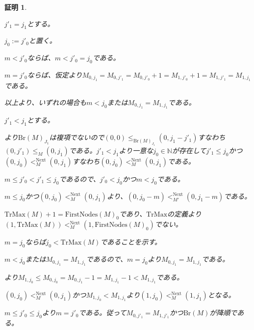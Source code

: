 \documentclass[dvipdfmx,uplatex]{jsarticle}
\theoremstyle{customnonumberbreakfortheorem}
\theoremstyle{customnonumberbreakforproof}
\newtheorem{hideableproof}{証明}
\begin{document}
\begin{hideableproof}
	\begin{indented}
		\item \(j'_1 = j_1\)とする。
		\begin{indented}
			\item \(j_0 := j'_0\)と置く。
			\item \(m < j'_0\)ならば、\(m < j'_0 = j_0\)である。
			\item \(m = j'_0\)ならば、仮定より\(M_{0,j_1} = M_{0,j'_1} = M_{0,j'_0}+1 = M_{1,j'_0}+1 = M_{1,j'_1} = M_{1,j_1}\)である。
			\item 以上より、いずれの場合も\(m < j_0\)または\(M_{0,j_1} = M_{1,j_1}\)である。
		\end{indented}
		\item \(j'_1 < j_1\)とする。
		\begin{indented}
			\item {}より\(\textrm{Br}(M)_{J_1}\)は複項でないので\((0,0) \leq_{\textrm{Br}(M)_{J_1}} (0,j_1-j'_1)\)すなわち\((0,j'_1) \leq_M (0,j_1)\)である。\(j'_1 < j_1\)より一意な\(j_0 \in \mathbb{N}\)が存在して\(j'_1 \leq j_0\)かつ\((0,j_0) <_M^{\textrm{Next}} (0,j_1)\)すなわち\((0,j_0) <_M^{\textrm{Next}} (0,j_1)\)である。
			\item \(m \leq j'_0 < j'_1 \leq j_0\)であるので、\(j'_0 < j_0\)かつ\(m < j_0\)である。
		\end{indented}
		\item \(m \leq j_0\)かつ\((0,j_0) <_M^{\textrm{Next}} (0,j_1)\)より、\((0,j_0-m) <_{M'}^{\textrm{Next}} (0,j_1-m)\)である。
		\item \(\textrm{TrMax}(M)+1 = \textrm{FirstNodes}(M)_0\)であり、\(\textrm{TrMax}\)の定義より\((1,\textrm{TrMax}(M)) <_M^{\textrm{Next}} (1,\textrm{FirstNodes}(M)_0)\)でない。
		\item
		\item \(m = j_0\)ならば\(j_0 < \textrm{TrMax}(M)\)であることを示す。
		\begin{indented}
			\item \(m < j_0\)または\(M_{0,j_1} = M_{1,j_1}\)であるので、\(m = j_0\)より\(M_{0,j_1} = M_{1,j_1}\)である。
			\item {}より\(M_{1,j_0} \leq M_{0,j_0} = M_{0,j_1}-1 = M_{1,j_1}-1 < M_{1,j_1}\)である。
			\item \((0,j_0) <_M^{\textrm{Next}} (0,j_1)\)かつ\(M_{1,j_0} < M_{1,j_1}\)より\((1,j_0) <_M^{\textrm{Next}} (1,j_1)\)となる。
			\item \(m \leq j'_0 \leq j_0\)より\(m = j'_0\)である。従って\(M_{0,j'_1} = M_{1,j'_1}\)かつ\(\textrm{Br}(M)\)が降順である。

\end{indented}
\end{indented}
\end{hideableproof}
\end{document}
